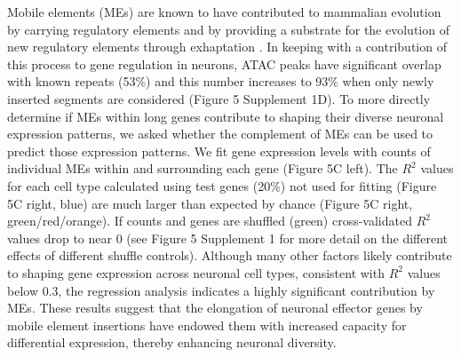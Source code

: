 Mobile elements (MEs) are known to have contributed to mammalian evolution by carrying regulatory elements \citep{Johnson_2006,Chuong_2016a} and by providing a substrate for the evolution of new regulatory elements through exhaptation \citep{Mikkelsen_2007,Sasaki_2008}. In keeping with a contribution of this process to gene regulation in neurons, ATAC peaks have significant overlap with known repeats (53\%) and this number increases to 93\% when only newly inserted segments are considered (Figure 5 Supplement 1D). To more directly determine if MEs within long genes contribute to shaping their diverse neuronal expression patterns, we asked whether the complement of MEs can be used to predict those expression patterns. We fit gene expression levels with counts of individual MEs within and surrounding each gene (Figure 5C left). The $R^2$ values for each cell type calculated using test genes (20\%) not used for fitting (Figure 5C right, blue) are much larger than expected by chance (Figure 5C right, green/red/orange). If counts and genes are shuffled (green) cross-validated $R^2$ values drop to near 0 (see Figure 5 Supplement 1 for more detail on the different effects of different shuffle controls). 
Although many other factors likely contribute to shaping gene expression across neuronal cell types, consistent with $R^2$ values below 0.3, the regression analysis indicates a highly significant contribution by MEs. These results suggest that the elongation of neuronal effector genes by mobile element insertions have endowed them with increased capacity for differential expression, thereby  enhancing neuronal diversity. 


